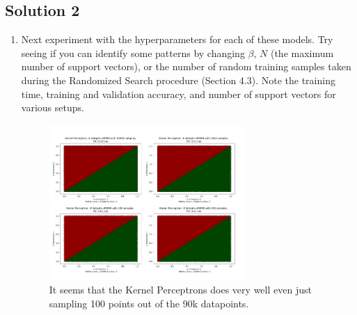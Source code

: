 \documentclass[submit]{harvardml}
\newenvironment{answer}{%
    \color{answergreen}\bf}
  {%
  }
\begin{document}
\subsection*{Solution 2}
\begin{enumerate}
\item Next experiment with the hyperparameters for each of these
  models. Try seeing if you can identify some patterns by changing
  $\beta$, $N$ (the maximum number of support vectors), or the number
  of random training samples taken during the Randomized Search
  procedure (Section 4.3).  Note the training time, training and
  validation accuracy, and number of support vectors for various
  setups.
  \begin{answer}

            \begin{figure}[H]
                \centering
                \includegraphics[width=0.7\textwidth]{kernel.png}
                \caption{It seems that the Kernel Perceptrons does very well even just sampling 100
                points out of the 90k datapoints.}
                \label{Problem 1, part 1.}
            \end{figure}


\end{answer}
\end{enumerate}
\end{document}
